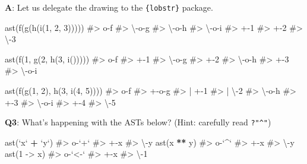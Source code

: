 \documentclass[
]{krantz}
\makeatletter
\newenvironment{Shaded}{\begin{snugshade}}{\end{snugshade}}
\newcommand{\CommentTok}[1]{\textcolor[rgb]{0.56,0.35,0.01}{\textit{#1}}}
\newcommand{\DataTypeTok}[1]{\textcolor[rgb]{0.13,0.29,0.53}{#1}}
\newcommand{\DecValTok}[1]{\textcolor[rgb]{0.00,0.00,0.81}{#1}}
\newcommand{\KeywordTok}[1]{\textcolor[rgb]{0.13,0.29,0.53}{\textbf{#1}}}
\newcommand{\NormalTok}[1]{#1}
\newcommand{\OperatorTok}[1]{\textcolor[rgb]{0.81,0.36,0.00}{\textbf{#1}}}
\newcommand{\StringTok}[1]{\textcolor[rgb]{0.31,0.60,0.02}{#1}}
\newenvironment{kframe}{%
\medskip{}
\setlength{\fboxsep}{.8em}
 \def\at@end@of@kframe{}%
 \ifinner\ifhmode%
  \def\at@end@of@kframe{\end{minipage}}%
  \begin{minipage}{\columnwidth}%
 \fi\fi%
 \def\FrameCommand##1{\hskip\@totalleftmargin \hskip-\fboxsep
 \colorbox{shadecolor}{##1}\hskip-\fboxsep
     \hskip-\linewidth \hskip-\@totalleftmargin \hskip\columnwidth}%
 \MakeFramed {\advance\hsize-\width
   \@totalleftmargin\z@ \linewidth\hsize
   \@setminipage}}%
 {\par\unskip\endMakeFramed%
 \at@end@of@kframe}
\renewenvironment{Shaded}{\begin{kframe}}{\end{kframe}}
\renewcommand{\KeywordTok} [1]{\textcolor[rgb]{0.00,0.44,0.13}{{#1}}}
\renewcommand{\DataTypeTok}[1]{\textcolor[rgb]{0.56,0.13,0.00}{{#1}}}
\renewcommand{\DecValTok}  [1]{\textcolor[rgb]{0.25,0.63,0.44}{{#1}}}
\renewcommand{\StringTok}  [1]{\textcolor[rgb]{0.25,0.44,0.63}{{#1}}}
\renewcommand{\CommentTok} [1]{\textcolor[rgb]{0.38,0.63,0.69}{{#1}}}
\renewcommand{\NormalTok}  [1]{{#1}}
\makeatother
\begin{document}
\textbf{{A}}: Let us delegate the drawing to the \texttt{\{lobstr\}} package.

\begin{Shaded}
\begin{Highlighting}[]
\KeywordTok{ast}\NormalTok{(}\KeywordTok{f}\NormalTok{(}\KeywordTok{g}\NormalTok{(}\KeywordTok{h}\NormalTok{(}\KeywordTok{i}\NormalTok{(}\DecValTok{1}\NormalTok{, }\DecValTok{2}\NormalTok{, }\DecValTok{3}\NormalTok{)))))}
\CommentTok{#> o-f }
\CommentTok{#> \textbackslash{}-o-g }
\CommentTok{#>   \textbackslash{}-o-h }
\CommentTok{#>     \textbackslash{}-o-i }
\CommentTok{#>       +-1 }
\CommentTok{#>       +-2 }
\CommentTok{#>       \textbackslash{}-3}

\KeywordTok{ast}\NormalTok{(}\KeywordTok{f}\NormalTok{(}\DecValTok{1}\NormalTok{, }\KeywordTok{g}\NormalTok{(}\DecValTok{2}\NormalTok{, }\KeywordTok{h}\NormalTok{(}\DecValTok{3}\NormalTok{, }\KeywordTok{i}\NormalTok{()))))}
\CommentTok{#> o-f }
\CommentTok{#> +-1 }
\CommentTok{#> \textbackslash{}-o-g }
\CommentTok{#>   +-2 }
\CommentTok{#>   \textbackslash{}-o-h }
\CommentTok{#>     +-3 }
\CommentTok{#>     \textbackslash{}-o-i}

\KeywordTok{ast}\NormalTok{(}\KeywordTok{f}\NormalTok{(}\KeywordTok{g}\NormalTok{(}\DecValTok{1}\NormalTok{, }\DecValTok{2}\NormalTok{), }\KeywordTok{h}\NormalTok{(}\DecValTok{3}\NormalTok{, }\KeywordTok{i}\NormalTok{(}\DecValTok{4}\NormalTok{, }\DecValTok{5}\NormalTok{))))}
\CommentTok{#> o-f }
\CommentTok{#> +-o-g }
\CommentTok{#> | +-1 }
\CommentTok{#> | \textbackslash{}-2 }
\CommentTok{#> \textbackslash{}-o-h }
\CommentTok{#>   +-3 }
\CommentTok{#>   \textbackslash{}-o-i }
\CommentTok{#>     +-4 }
\CommentTok{#>     \textbackslash{}-5}
\end{Highlighting}
\end{Shaded}

\textbf{{Q3}}: What's happening with the ASTs below? (Hint: carefully read \texttt{?"\^{}"})

\begin{Shaded}
\begin{Highlighting}[]
\KeywordTok{ast}\NormalTok{(}\StringTok{`}\DataTypeTok{x}\StringTok{`} \OperatorTok{+}\StringTok{ `}\DataTypeTok{y}\StringTok{`}\NormalTok{)}
\CommentTok{#> o-`+` }
\CommentTok{#> +-x }
\CommentTok{#> \textbackslash{}-y}
\KeywordTok{ast}\NormalTok{(x }\OperatorTok{**}\StringTok{ }\NormalTok{y)}
\CommentTok{#> o-`^` }
\CommentTok{#> +-x }
\CommentTok{#> \textbackslash{}-y}
\KeywordTok{ast}\NormalTok{(}\DecValTok{1}\NormalTok{ ->}\StringTok{ }\NormalTok{x)}
\CommentTok{#> o-`<-` }
\CommentTok{#> +-x }
\CommentTok{#> \textbackslash{}-1}
\end{Highlighting}
\end{Shaded}
\end{document}
